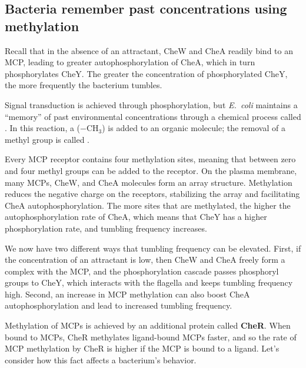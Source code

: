 \FloatBarrier
{}
\subsection{Bacteria remember past concentrations using methylation}

Recall that in the absence of an attractant, CheW and CheA readily bind to an MCP, leading to greater autophosphorylation of CheA, which in turn phosphorylates CheY. The greater the concentration of phosphorylated CheY, the more frequently the bacterium tumbles.

Signal transduction is achieved through phosphorylation, but \textit{E.~coli} maintains a ``memory'' of past environmental concentrations through a chemical process called . In this reaction, a  ($-\text{CH}_3$) is added to an organic molecule; the removal of a methyl group is called .

Every MCP receptor contains four methylation sites, meaning that between zero and four methyl groups can be added to the receptor. On the plasma membrane, many MCPs, CheW, and CheA molecules form an array structure. Methylation reduces the negative charge on the receptors, stabilizing the array and facilitating CheA autophosphorylation. The more sites that are methylated, the higher the autophosphorylation rate of CheA, which means that CheY has a higher phosphorylation rate, and tumbling frequency increases.

We now have two different ways that tumbling frequency can be elevated. First, if the concentration of an attractant is low, then CheW and CheA freely form a complex with the MCP, and the phosphorylation cascade passes phosphoryl groups to CheY, which interacts with the flagella and keeps tumbling frequency high. Second, an increase in MCP methylation can also boost CheA autophosphorylation and lead to increased tumbling frequency.

Methylation of MCPs is achieved by an additional protein called \textbf{CheR}. When bound to MCPs, CheR methylates ligand-bound MCPs faster, and so the rate of MCP methylation by CheR is higher if the MCP is bound to a ligand. Let's consider how this fact affects a bacterium's behavior.


